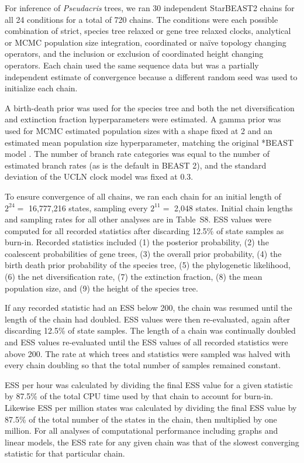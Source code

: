 \documentclass[nogrid]{MBE}%
\begin{document}
For inference of \textit{Pseudacris} trees, we ran 30 independent StarBEAST2
chains for all 24 conditions for a total of 720 chains. The conditions were
each possible combination of strict, species tree relaxed or gene tree relaxed
clocks, analytical or MCMC population size integration, coordinated or na\"ive
topology changing operators, and the inclusion or exclusion of coordinated
height changing operators. Each chain used the same sequence data but was a
partially independent estimate of convergence because a different random seed
was used to initialize each chain.

A birth-death prior was used for the species tree and both the net
diversification and extinction fraction hyperparameters were estimated. A
gamma prior was used for MCMC estimated population sizes with a shape fixed at
2 and an estimated mean population size hyperparameter, matching the original
*BEAST model \citep{Heled01032010}. The number of branch rate categories was
equal to the number of estimated branch rates (as is the default in BEAST 2),
and the standard deviation of the UCLN clock model was fixed at 0.3.

To ensure convergence of all chains, we ran each chain for an initial length
of $2^{24} =$ 16,777,216 states, sampling every $2^{11} =$ 2,048 states. Initial
chain lengths and sampling rates for all other analyses are in Table~S8. ESS
values were computed for all recorded statistics after discarding 12.5\% of
state samples as burn-in. Recorded statistics included (1) the posterior
probability, (2) the coalescent probabilities of gene trees, (3) the overall
prior probability, (4) the birth death prior probability of the species tree,
(5) the phylogenetic likelihood, (6) the net diversification rate, (7) the
extinction fraction, (8) the mean population size, and (9) the height of the
species tree.

If any recorded statistic had an ESS below 200, the chain was resumed until
the length of the chain had doubled. ESS values were then re-evaluated, again
after discarding 12.5\% of state samples. The length of a chain was
continually doubled and ESS values re-evaluated until the ESS values of all
recorded statistics were above 200. The rate at which trees and statistics
were sampled was halved with every chain doubling so that the total number of
samples remained constant.

ESS per hour was calculated by dividing the final ESS value for a given
statistic by 87.5\% of the total CPU time used by that chain to account for
burn-in. Likewise ESS per million states was calculated by dividing the final
ESS value by 87.5\% of the total number of the states in the chain, then
multiplied by one million. For all analyses of computational performance
including graphs and linear models, the ESS rate for any given chain was that
of the slowest converging statistic for that particular chain.
\end{document}
